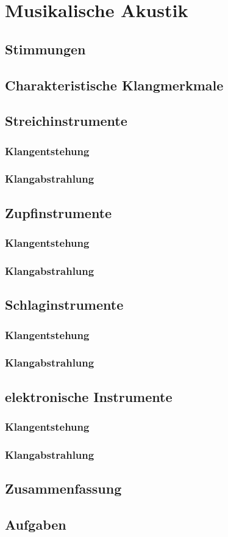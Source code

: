 \chapter{Musikalische Akustik}\label{chap:musak}
\thispagestyle{empty}
\section{Stimmungen}
\section{Charakteristische Klangmerkmale}

\section{Streichinstrumente}
\subsection{Klangentstehung}
\subsection{Klangabstrahlung}

\section{Zupfinstrumente}
\subsection{Klangentstehung}
\subsection{Klangabstrahlung}

\section{Schlaginstrumente}
\subsection{Klangentstehung}
\subsection{Klangabstrahlung}

\section{elektronische Instrumente}
\subsection{Klangentstehung}
\subsection{Klangabstrahlung}

\section{Zusammenfassung}

\section{Aufgaben}

\nocite{meyer}
